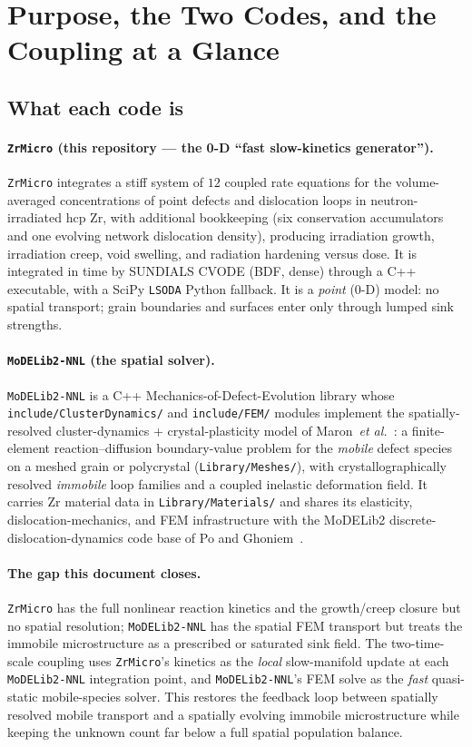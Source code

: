 \documentclass[11pt]{article}
\newcommand{\ZrMicro}{\texttt{ZrMicro}}
\newcommand{\MoDELib}{\texttt{MoDELib2-NNL}}
\newcommand{\code}[1]{\texttt{#1}}
\begin{document}
\tableofcontents
\newpage

\section{Purpose, the Two Codes, and the Coupling at a Glance}
\label{sec:purpose}

\subsection{What each code is}

\paragraph{\ZrMicro{} (this repository --- the 0-D ``fast slow-kinetics generator'').}
\ZrMicro{} integrates a stiff system of $12$ coupled rate equations for the
volume-averaged concentrations of point defects and dislocation loops in
neutron-irradiated hcp Zr, with additional bookkeeping (six conservation
accumulators and one evolving network dislocation density), producing
irradiation growth, irradiation creep, void swelling, and radiation hardening
versus dose. It is integrated in time by SUNDIALS CVODE (BDF, dense) through a
C++ executable, with a SciPy \code{LSODA} Python fallback. It is a \emph{point}
(0-D) model: no spatial transport; grain boundaries and surfaces enter only
through lumped sink strengths.

\paragraph{\MoDELib{} (the spatial solver).}
\MoDELib{} is a C++ Mechanics-of-Defect-Evolution library whose
\code{include/ClusterDynamics/} and \code{include/FEM/} modules implement the
spatially-resolved cluster-dynamics + crystal-plasticity model of
Maron~\emph{et al.}~\cite{Maron2024}: a finite-element reaction--diffusion
boundary-value problem for the \emph{mobile} defect species on a meshed grain or
polycrystal (\code{Library/Meshes/}), with crystallographically resolved
\emph{immobile} loop families and a coupled inelastic deformation field. It
carries Zr material data in \code{Library/Materials/} and shares its elasticity,
dislocation-mechanics, and FEM infrastructure with the MoDELib2
discrete-dislocation-dynamics code base of Po and Ghoniem~\cite{Po2014MoDELib}.

\paragraph{The gap this document closes.}
\ZrMicro{} has the full nonlinear reaction kinetics and the growth/creep closure
but no spatial resolution; \MoDELib{} has the spatial FEM transport but treats
the immobile microstructure as a prescribed or saturated sink field. The
two-time-scale coupling uses \ZrMicro{}'s kinetics as the \emph{local}
slow-manifold update at each \MoDELib{} integration point, and \MoDELib{}'s FEM
solve as the \emph{fast} quasi-static mobile-species solver. This restores the
feedback loop between spatially resolved mobile transport and a spatially
evolving immobile microstructure while keeping the unknown count far below a full
spatial population balance.
\end{document}
